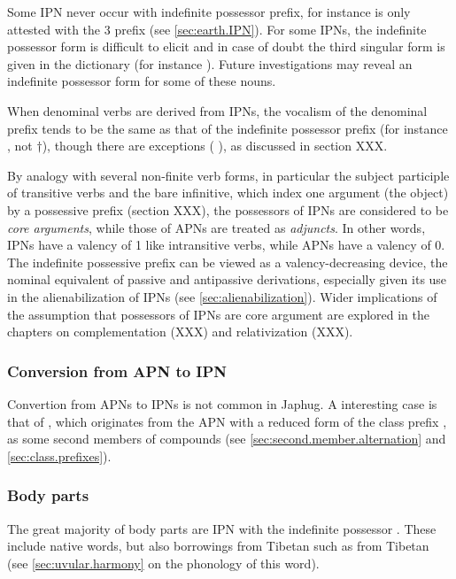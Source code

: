 Some IPN never occur with indefinite possessor prefix, for instance  is only attested with the 3\sg{}  prefix (see \ref{sec:earth.IPN}). For some IPNs, the indefinite possessor form is difficult to elicit and in case of doubt the third singular form is given in the dictionary \citet{jacques16japhug} (for instance ). Future investigations may reveal an indefinite possessor form for some of these nouns.

When denominal verbs are derived from IPNs, the vocalism of the denominal prefix tends to be the same as that of the  indefinite possessor prefix (for instance  \fl{} , not $\dagger$), though there are exceptions ( \fl{} ), as discussed in section XXX.

By analogy with several non-finite verb forms, in particular the subject participle of transitive verbs and the bare infinitive, which index one argument (the object) by a possessive prefix (section XXX), the possessors of IPNs are considered to be \textit{core arguments}, while those of APNs are treated as \textit{adjuncts}. In other words, IPNs have a valency of 1 like intransitive verbs, while APNs have a valency of 0. The indefinite possessive prefix can be viewed as a valency-decreasing device, the nominal equivalent of passive and antipassive derivations, especially given its use in the alienabilization of IPNs (see \ref{sec:alienabilization}). Wider implications of the assumption that possessors of IPNs are core argument are explored in the chapters on complementation (XXX) and relativization (XXX).

\subsubsection{Conversion from APN to IPN} \label{sec:apn.to.ipn}
Convertion from APNs to IPNs is not common in Japhug. A interesting case is that of , which originates from the APN  with a reduced form  of the class prefix , as some second members of compounds (see \ref{sec:second.member.alternation} and \ref{sec:class.prefixes}).

\subsubsection{Body parts} \label{sec:body.part}
The great majority of body parts are IPN with the indefinite possessor . These include native words, but also borrowings from Tibetan such as  from Tibetan  (see \ref{sec:uvular.harmony} on the phonology of this word).

